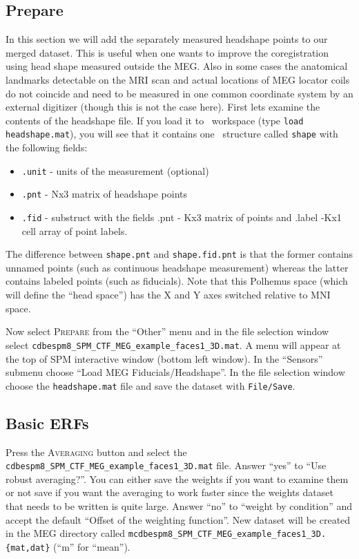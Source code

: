 \subsection{Prepare}

In this section we will add the separately measured headshape points to our merged dataset. This is useful when one wants to improve the coregistration using head shape measured outside the MEG. Also in some cases the anatomical landmarks detectable on the MRI scan and actual locations of MEG locator coils do not coincide and need to be measured in one common coordinate system by an external digitizer (though this is not the case here). First lets examine the contents of the headshape file. If you load it to \matlab\ workspace (type \texttt{load headshape.mat}), you will see that it contains one \matlab\ structure called \texttt{shape} with the following fields:
\begin{itemize}
\item \texttt{.unit} - units of the measurement (optional)
\item \texttt{.pnt} - Nx3 matrix of headshape points
\item \texttt{.fid} - substruct with the fields .pnt - Kx3 matrix of points and .label -Kx1 cell array of point labels.
\end{itemize}

The difference between \texttt{shape.pnt} and \texttt{shape.fid.pnt} is that the former contains unnamed points (such as continuous headshape measurement) whereas the latter contains labeled points (such as fiducials). Note that this Polhemus space (which will define the ``head space'') has the X and Y axes switched relative to MNI space.

Now select \textsc{Prepare} from the ``Other'' menu and in the file selection window select \texttt{cdbespm8\_\-SPM\_\-CTF\_\-MEG\_\-example\_\-faces1\_3D.mat}. A menu will appear at the top of SPM interactive window (bottom left window). In the ``Sensors'' submenu choose ``Load MEG Fiducials/Headshape''. In the file selection window choose the \texttt{headshape.mat} file and save the dataset with \texttt{File/Save}.

\subsection{Basic ERFs} 

Press the \textsc{Averaging} button and select the \texttt{cdbespm8\_SPM\_CTF\_MEG\_example\_faces1\_3D.mat} file. Answer ``yes'' to ``Use robust averaging?''. You can either save the weights if you want to examine them or not save if you want the averaging to work faster since the weights dataset that needs to be written is quite large. Answer ``no'' to ``weight by condition'' and accept the default ``Offset of the weighting function''. New dataset will be created in the MEG directory called \texttt{mcdbespm8\_SPM\_CTF\_MEG\_example\_faces1\_3D.\{mat,dat\}} (``m'' for ``mean'').

